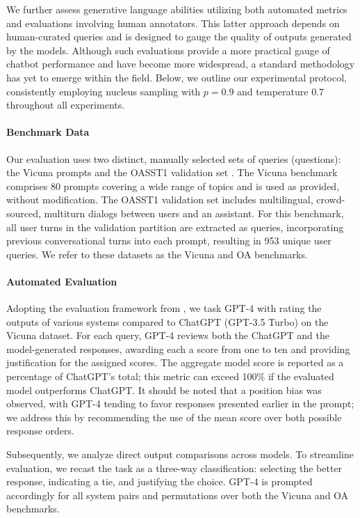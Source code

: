 We further assess generative language abilities utilizing both automated metrics and evaluations involving human annotators. This latter approach depends on human-curated queries and is designed to gauge the quality of outputs generated by the models. Although such evaluations provide a more practical gauge of chatbot performance and have become more widespread, a standard methodology has yet to emerge within the field. Below, we outline our experimental protocol, consistently employing nucleus sampling with $p=0.9$ and temperature $0.7$ throughout all experiments.

\paragraph{Benchmark Data} Our evaluation uses two distinct, manually selected sets of queries (questions): the Vicuna prompts \citep{vicuna2023} and the OASST1 validation set \citep{kopf2023openassistant}. The Vicuna benchmark comprises 80 prompts covering a wide range of topics and is used as provided, without modification. The OASST1 validation set includes multilingual, crowd-sourced, multiturn dialogs between users and an assistant. For this benchmark, all user turns in the validation partition are extracted as queries, incorporating previous conversational turns into each prompt, resulting in 953 unique user queries. We refer to these datasets as the Vicuna and OA benchmarks.

\paragraph{Automated Evaluation} Adopting the evaluation framework from \citet{vicuna2023}, we task GPT-4 with rating the outputs of various systems compared to ChatGPT (GPT-3.5 Turbo) on the Vicuna dataset. For each query, GPT-4 reviews both the ChatGPT and the model-generated responses, awarding each a score from one to ten and providing justification for the assigned scores. The aggregate model score is reported as a percentage of ChatGPT's total; this metric can exceed 100\% if the evaluated model outperforms ChatGPT. It should be noted that a position bias was observed, with GPT-4 tending to favor responses presented earlier in the prompt; we address this by recommending the use of the mean score over both possible response orders.

Subsequently, we analyze direct output comparisons across models. To streamline evaluation, we recast the task as a three-way classification: selecting the better response, indicating a tie, and justifying the choice. GPT-4 is prompted accordingly for all system pairs and permutations over both the Vicuna and OA benchmarks.

